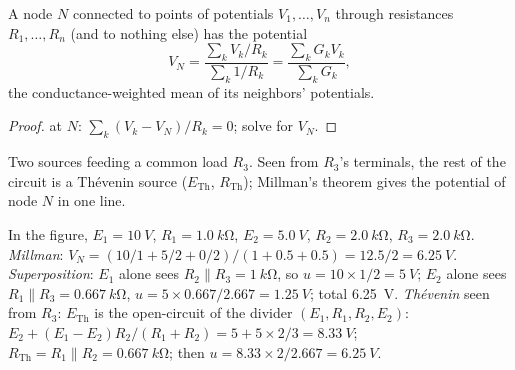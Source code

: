 \begin{proposition}\label{prop:b1:dc-circuits:millman}
A node $N$ connected to points of potentials $V_1, \dots, V_n$ through
resistances $R_1, \dots, R_n$ (and to nothing else) has the potential
\[
V_N = \frac{\sum_k V_k/R_k}{\sum_k 1/R_k} = \frac{\sum_k G_k V_k}{\sum_k G_k},
\]
the conductance-weighted mean of its neighbors' potentials.
\end{proposition}

\begin{proof}
 at $N$: $\sum_k (V_k - V_N)/R_k = 0$; solve for $V_N$.
\end{proof}

\begin{omfigure}

{\small Two sources feeding a common load $R_3$. Seen from $R_3$'s
terminals, the rest of the circuit is a Thévenin source
($E_{\mathrm{Th}}$, $R_{\mathrm{Th}}$); Millman's theorem gives the
potential of node $N$ in one line.}
\end{omfigure}

\begin{example}\label{ex:b1:dc-circuits:threeways}
In the figure, $E_1 = \qty{10}{V}$, $R_1 = \qty{1.0}{k\ohm}$, $E_2 =
\qty{5.0}{V}$, $R_2 = \qty{2.0}{k\ohm}$, $R_3 = \qty{2.0}{k\ohm}$.
\emph{Millman}: $V_N = (10/1 + 5/2 + 0/2)/(1 + 0.5 + 0.5) = 12.5/2 =
\qty{6.25}{V}$. \emph{Superposition}: $E_1$ alone sees $R_2 \parallel
R_3 = \qty{1}{k\ohm}$, so $u = 10 \times 1/2 = \qty{5}{V}$; $E_2$ alone
sees $R_1 \parallel R_3 = \qty{0.667}{k\ohm}$, $u = 5 \times 0.667/2.667
= \qty{1.25}{V}$; total \qty{6.25}{V}. \emph{Thévenin} seen from
$R_3$: $E_{\mathrm{Th}}$ is the open-circuit  of the divider
$(E_1, R_1, R_2, E_2)$: $E_2 + (E_1 - E_2)R_2/(R_1 + R_2) = 5 + 5 \times
2/3 = \qty{8.33}{V}$; $R_{\mathrm{Th}} = R_1 \parallel R_2 =
\qty{0.667}{k\ohm}$; then $u = 8.33 \times 2/2.667 = \qty{6.25}{V}$.
\end{example}

